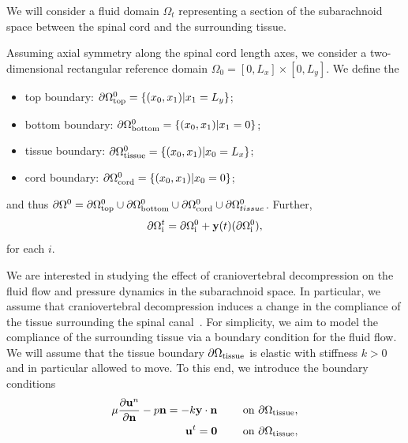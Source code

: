 \documentclass[11pt,a4paper,titlepage]{report}
\begin{document}
We will consider a fluid domain $\Omega_t$ representing a section of
the subarachnoid space between the spinal cord and the surrounding
tissue.

Assuming axial symmetry along the spinal cord length axes, we consider
a two-dimensional rectangular reference domain $\Omega_0 = [0, L_x]
\times [0, L_y]$. We define the
\begin{itemize}
\item
  top boundary: $\partial \Omega_{\rm top}^0 = \{ (x_0, x_1) | x_1 = L_y\}$;
\item
  bottom boundary: $\partial \Omega_{\rm bottom}^0 = \{ (x_0, x_1) | x_1 = 0\}$;
\item
  tissue boundary: $\partial \Omega_{\rm tissue}^0 = \{ (x_0, x_1) | x_0 = L_x\}$;
\item
  cord boundary: $\partial \Omega_{\rm cord}^0 = \{ (x_0, x_1) | x_0 = 0\}$;
\end{itemize}
and thus $\partial \Omega^0 = \partial \Omega_{\rm top}^0 \cup
\partial \Omega_{\rm bottom}^0 \cup \partial \Omega_{\rm cord}^0 \cup
\partial \Omega_{tissue}^0$. Further,
\begin{equation}
  \partial \Omega^t_{\rm i} = \partial \Omega^0_{\rm i} + \mathbf{y}(t)(\partial \Omega^0_{\rm i}),
\end{equation}
for each $i$.

We are interested in studying the effect of craniovertebral
decompression on the fluid flow and pressure dynamics in the
subarachnoid space. In particular, we assume that craniovertebral
decompression induces a change in the compliance of the tissue
surrounding the spinal canal~\cite{}. For simplicity, we aim to model
the compliance of the surrounding tissue via a boundary condition for
the fluid flow. We will assume that the tissue boundary $\partial
\Omega_{\rm tissue}$ is elastic with stiffness $k > 0$ and in particular
allowed to move. To this end, we introduce the boundary conditions
\begin{align}
\mu \frac{\partial \mathbf{u}^n}{\partial \mathbf{n}} - p \mathbf{n} = - k \mathbf{y} \cdot \mathbf{n} \qquad \text{ on } \partial \Omega_{\rm tissue},\\
\mathbf{u}^t = \mathbf{0} \qquad \text{ on } \partial \Omega_{\rm tissue},
\end{align}

\end{document}

